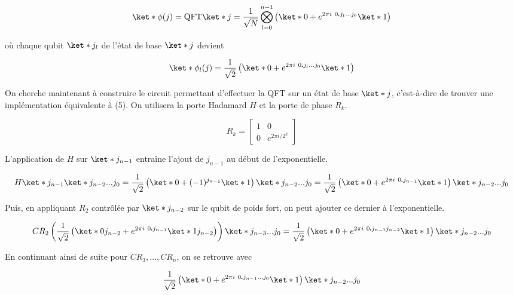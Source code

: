 \begin{equation}
    \ket*{\phi(j)} = \text{QFT}\ket*{j} = \frac{1}{\sqrt{N}} \bigotimes_{l=0}^{n-1}\left(\ket*{0} + e^{2\pi i \ 0\pmb{.}j_l ... j_0} \ket*{1}\right) 
\end{equation}

où chaque qubit $\ket*{j_l}$ de l'état de base $\ket*{j}$ devient 

\begin{equation*}
    \ket*{\phi_l(j)} = \frac{1}{\sqrt{2}}\left(\ket*{0} + e^{2\pi i \ 0\pmb{.}j_l...j_0}\ket*{1}\right)
\end{equation*}

On cherche maintenant à construire le circuit permettant d'effectuer la QFT sur un état de base $\ket*{j}$, c'est-à-dire de trouver une implémentation équivalente à (5).
On utilisera la porte Hadamard $H$ et la porte de phase $R_k$.

\begin{equation*}
    R_k = \begin{bmatrix}
        1 & 0 \\
        0 & e^{2\pi i/2^k}
    \end{bmatrix}
\end{equation*}

L'application de $H$ sur $\ket*{j_{n-1}}$ entraîne l'ajout de  $j_{n-1}$ au début de l'exponentielle.

\begin{equation*}
    H\ket*{j_{n-1}} \ket*{j_{n-2} ... j_0} = \frac{1}{\sqrt{2}} \left(\ket*{0} + (-1)^{j_{n-1}} \ket*{1}\right) \ket*{j_{n-2} ... j_0} = \frac{1}{\sqrt{2}}\left(\ket*{0} + e^{2\pi i \ 0\pmb{.}j_{n-1}} \ket*{1} \right) \ket*{j_{n-2} ... j_0}
\end{equation*}

Puis, en appliquant $R_2$ contrôlée par $\ket*{j_{n-2}}$ sur le qubit de poids fort, on peut ajouter ce dernier  à l'exponentielle.  

\begin{equation*}
    CR_2 \left( \frac{1}{\sqrt{2}}\left(\ket*{0 j_{n-2}} + e^{2\pi i \ 0\pmb{.}j_{n-1}} \ket*{1 j_{n-2}} \right)\right) \ket*{j_{n-3} ... j_0} = \frac{1}{\sqrt{2}}\left(\ket*{0} + e^{2\pi i \ 0\pmb{.}j_{n-1}j_{n-2}} \ket*{1} \right) \ket*{j_{n-2} ... j_0}
\end{equation*}

En continuant ainsi de suite pour $CR_3, ..., CR_n$, on se retrouve avec

\begin{equation*}
    \frac{1}{\sqrt{2}} \left(\ket*{0} + e^{2\pi i \ 0\pmb{.}j_{n-1}...j_0} \ket*{1}\right) \ket*{j_{n-2} ... j_0}
\end{equation*}

